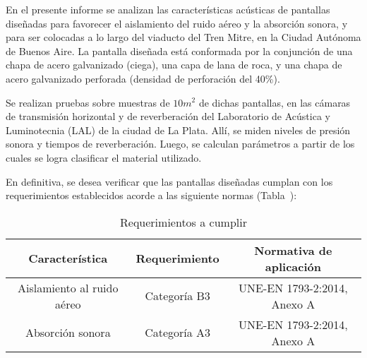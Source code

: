 \par En el presente informe se analizan las características acústicas de pantallas diseñadas para favorecer el aislamiento del ruido aéreo y la absorción sonora, y para ser colocadas a lo largo del viaducto del Tren Mitre, en la Ciudad Autónoma de Buenos Aire. 
La pantalla diseñada está conformada por la conjunción de  una chapa de acero galvanizado (ciega), una capa de lana de
roca, y una chapa de acero galvanizado perforada (densidad de perforación del 40\%).

\par Se realizan pruebas sobre muestras de $10 m^2$ de dichas pantallas, en las cámaras de transmisión horizontal y de reverberación del Laboratorio de Acústica y Luminotecnia (LAL) de la ciudad de La Plata. Allí, se miden niveles de presión sonora y tiempos de reverberación. Luego, se calculan parámetros a partir de los cuales se logra clasificar el material utilizado. 

\par En definitiva, se desea verificar que las pantallas diseñadas cumplan con los requerimientos establecidos acorde a las siguiente normas (Tabla~):

\begin{table}[!h]
    \centering
    \begin{tabular}{|c|c|c|} \hline
        \textbf{Característica} & \textbf{Requerimiento} & \textbf{Normativa de aplicación}\\ \hline
        Aislamiento al ruido aéreo & Categoría B3 & UNE-EN 1793-2:2014, Anexo A\\ \hline
        Absorción sonora & Categoría A3 & UNE-EN 1793-2:2014, Anexo A \\ \hline
    \end{tabular}
    \caption{Requerimientos a cumplir}
    \label{tab:requerimientos_a_cumplir}
\end{table}


